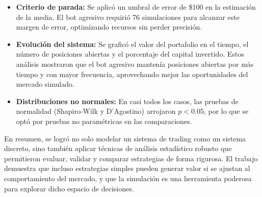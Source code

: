 \documentclass[a4paper,12pt]{article}
\begin{document}
\begin{itemize}
  \item \textbf{Criterio de parada:} Se aplicó un umbral de error de \$100 en la estimación de la media. El bot agresivo requirió 76 simulaciones para alcanzar este margen de error, optimizando recursos sin perder precisión.

  \item \textbf{Evolución del sistema:} Se graficó el valor del portafolio en el tiempo, el número de posiciones abiertas y el porcentaje del capital invertido. Estos análisis mostraron que el bot agresivo mantenía posiciones abiertas por más tiempo y con mayor frecuencia, aprovechando mejor las oportunidades del mercado simulado.

  \item \textbf{Distribuciones no normales:} En casi todos los casos, las pruebas de normalidad (Shapiro-Wilk y D’Agostino) arrojaron \( p < 0.05 \), por lo que se optó por pruebas no paramétricas en las comparaciones.

\end{itemize}

En resumen, se logró no solo modelar un sistema de trading como un sistema discreto, sino también aplicar técnicas de análisis estadístico robusto que permitieron evaluar, validar y comparar estrategias de forma rigurosa. El trabajo demuestra que incluso estrategias simples pueden generar valor si se ajustan al comportamiento del mercado, y que la simulación es una herramienta poderosa para explorar dicho espacio de decisiones.
\end{document}
